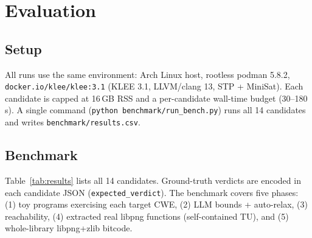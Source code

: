 \documentclass[3p,times,procedia]{elsarticle}
\begin{document}
\section{Evaluation}
\label{sec:eval}

\subsection{Setup}

All runs use the same environment: Arch Linux host, rootless podman 5.8.2, \texttt{docker.io/klee/klee:3.1} (KLEE 3.1, LLVM/clang 13, STP + MiniSat). Each candidate is capped at 16\,GB RSS and a per-candidate wall-time budget (30--180\,s). A single command (\texttt{python benchmark/run\_bench.py}) runs all 14 candidates and writes \texttt{benchmark/results.csv}.

\subsection{Benchmark}

Table~\ref{tab:results} lists all 14 candidates. Ground-truth verdicts are encoded in each candidate JSON (\texttt{expected\_verdict}). The benchmark covers five phases: (1) toy programs exercising each target CWE, (2) LLM bounds + auto-relax, (3) reachability, (4) extracted real libpng functions (self-contained TU), and (5) whole-library libpng+zlib bitcode.
\end{document}
